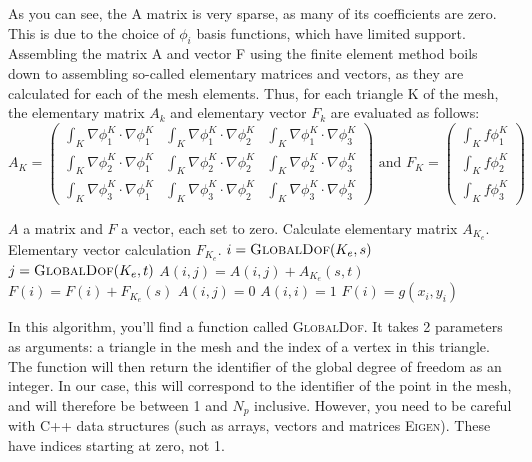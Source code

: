 \documentclass[english,10pt,a4paper]{article}
\begin{document}
As you can see, the A matrix is very sparse, as many of its coefficients are zero.
This is due to the choice of $\phi_i$ basis functions, which have limited support.
Assembling the matrix A and vector F using the finite element method boils down to assembling so-called elementary matrices and vectors, as they are calculated for each of the mesh elements. 
Thus, for each triangle K of the mesh, the elementary matrix $A_k$ and elementary vector $F_k$ are evaluated as follows:
\begin{equation*}
A_K = \left(
  \begin{matrix}
    \displaystyle \int_K \nabla \phi_1^K \cdot \nabla \phi_1^K & \displaystyle \int_K \nabla \phi_1^K \cdot \nabla \phi_2^K & \displaystyle \int_K \nabla \phi_1^K \cdot \nabla \phi_3^K \\
    \displaystyle \int_K \nabla \phi_2^K \cdot \nabla \phi_1^K & \displaystyle \int_K \nabla \phi_2^K \cdot \nabla \phi_2^K & \displaystyle \int_K \nabla \phi_2^K \cdot \nabla \phi_3^K \\
    \displaystyle \int_K \nabla \phi_3^K \cdot \nabla \phi_1^K & \displaystyle \int_K \nabla \phi_3^K \cdot \nabla \phi_2^K & \displaystyle \int_K \nabla \phi_3^K \cdot \nabla \phi_3^K
  \end{matrix}
  \right)
  \text{ and }
  F_K = \left(
  \begin{matrix}
    \displaystyle \int_K f \phi_1^K \\
    \displaystyle \int_K f \phi_2^K \\
    \displaystyle \int_K f \phi_3^K
  \end{matrix}
  \right)
\end{equation*}




\begin{algorithmic}[1]
  \Require $A$ a matrix and $F$ a vector, each set to zero.
  \State Calculate elementary matrix $A_{K_e}$.
  \State Elementary vector calculation $F_{K_e}$.
  \State $i = \Call{GlobalDof}{K_e,s}$
  \State $j = \Call{GlobalDof}{K_e,t}$
  \State $A(i,j) = A(i,j) + A_{K_e}(s,t)$
  \EndFor
  \State $F(i) = F(i) + F_{K_e}(s)$
  \EndFor
  \EndFor
  \State $A(i,j)=0$
  \EndFor
  \State $A(i,i)=1$
  \State $F(i)=g(x_i,y_i)$
  \EndFor
\end{algorithmic}

In this algorithm, you'll find a function called \textsc{GlobalDof}. It takes 2 parameters as arguments: a triangle in the mesh and the index of a vertex in this triangle.
The function will then return the identifier of the global degree of freedom as an integer.
In our case, this will correspond to the identifier of the point in the mesh, and will therefore be between 1 and $N_p$ inclusive.
However, you need to be careful with C++ data structures (such as arrays, vectors and matrices \textsc{Eigen}). These have indices starting at zero, not 1.
\end{document}
